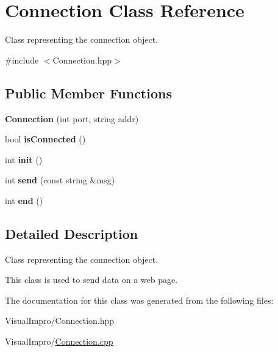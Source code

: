 \hypertarget{class_connection}{}\section{Connection Class Reference}
\label{class_connection}


Class representing the connection object.  




{\ttfamily \#include $<$Connection.\+hpp$>$}

\subsection*{Public Member Functions}
\begin{DoxyCompactItemize}
\item 
\mbox{\label{class_connection_af44f8f2a37b83b79c409b52a3f847d72}} 
{\bfseries Connection} (int port, string addr)
\item 
\mbox{\label{class_connection_a68536d10cc8bc26964a0e7eccfaab52c}} 
bool {\bfseries is\+Connected} ()
\item 
\mbox{\label{class_connection_a1643eeb65aa8e52f91bb40e15cac44c3}} 
int {\bfseries init} ()
\item 
\mbox{\label{class_connection_adb8e6e12b5f1601104fcb58ea0d9a00e}} 
int {\bfseries send} (const string \&msg)
\item 
\mbox{\label{class_connection_a83fc1fac060b92efe77cd4cca59fae0f}} 
int {\bfseries end} ()
\end{DoxyCompactItemize}


\subsection{Detailed Description}
Class representing the connection object. 

This class is used to send data on a web page. 

The documentation for this class was generated from the following files\+:\begin{DoxyCompactItemize}
\item 
Visual\+Impro/Connection.\+hpp\item 
Visual\+Impro/\mbox{\hyperlink{_connection_8cpp}{Connection.\+cpp}}\end{DoxyCompactItemize}

